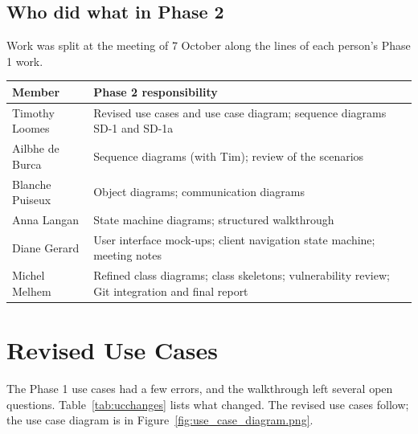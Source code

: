 \documentclass[11pt,a4paper]{article}
\begin{document}
\subsection*{Who did what in Phase 2}
Work was split at the meeting of 7 October along the lines of each person's Phase 1 work.

\begin{tabularx}{\textwidth}{l L}
\toprule
\textbf{Member} & \textbf{Phase 2 responsibility}\\ \midrule
Timothy Loomes & Revised use cases and use case diagram; sequence diagrams SD-1 and SD-1a\\
Ailbhe de Burca & Sequence diagrams (with Tim); review of the scenarios\\
Blanche Puiseux & Object diagrams; communication diagrams\\
Anna Langan & State machine diagrams; structured walkthrough\\
Diane Gerard & User interface mock-ups; client navigation state machine; meeting notes\\
Michel Melhem & Refined class diagrams; class skeletons; vulnerability review; Git integration and final report\\
\bottomrule
\end{tabularx}

\section{Revised Use Cases}\label{sec:usecases}

The Phase 1 use cases had a few errors, and the walkthrough left several open questions. Table~\ref{tab:ucchanges} lists what changed. The revised use cases follow; the use case diagram is in Figure~\ref{fig:use_case_diagram.png}.
\end{document}

